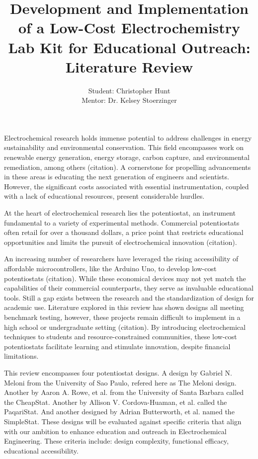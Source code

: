 \documentclass{article}
\title{\textcolor{mycolor}{\textbf{{\huge Development and Implementation of a Low-Cost Electrochemistry Lab Kit for Educational Outreach: Literature Review}}}}
\author{Student: Christopher Hunt \\ Mentor: Dr. Kelsey Stoerzinger}
\date{}
\begin{document}
\pagestyle{fancy}
\fancyhf{}
\rfoot{}
\rhead{\thepage}
\maketitle
Electrochemical research holds immense potential to address challenges in energy sustainability and environmental conservation. This field encompasses work on renewable energy generation, energy storage, carbon capture, and environmental remediation, among others (citation). A cornerstone for propelling advancements in these areas is educating the next generation of engineers and scientists. However, the significant costs associated with essential instrumentation, coupled with a lack of educational resources, present considerable hurdles.

At the heart of electrochemical research lies the potentiostat, an instrument fundamental to a variety of experimental methods. Commercial potentiostats often retail for over a thousand dollars, a price point that restricts educational opportunities and limits the pursuit of electrochemical innovation (citation).

An increasing number of researchers have leveraged the rising accessibility of affordable microcontrollers, like the Arduino Uno, to develop low-cost potentiostats (citation). While these economical devices may not yet match the capabilities of their commercial counterparts, they serve as invaluable educational tools. Still a gap exists between the research and the standardization of design for academic use. Literature explored in this review has shown designs all meeting benchmark testing, however, these projects remain difficult to implement in a high school or undergraduate setting (citation). By introducing electrochemical techniques to students and resource-constrained communities, these low-cost potentiostats facilitate learning and stimulate innovation, despite financial limitations.

This review encompasses four potentiostat designs. A design by Gabriel N. Meloni from the University of Sao Paulo, refered here as The Meloni design. Another by Aaron A. Rowe, et al. from the University of Santa Barbara called the CheapStat. Another by Allison V. Cordova-Huaman, et al. called the PaqariStat. And another designed by Adrian Butterworth, et al. named the SimpleStat. These designs will be evaluated against specific criteria that align with our ambition to enhance education and outreach in Electrochemical Engineering. These criteria include: design complexity, functional efficacy, educational accessibility. 
 
\end{document}
